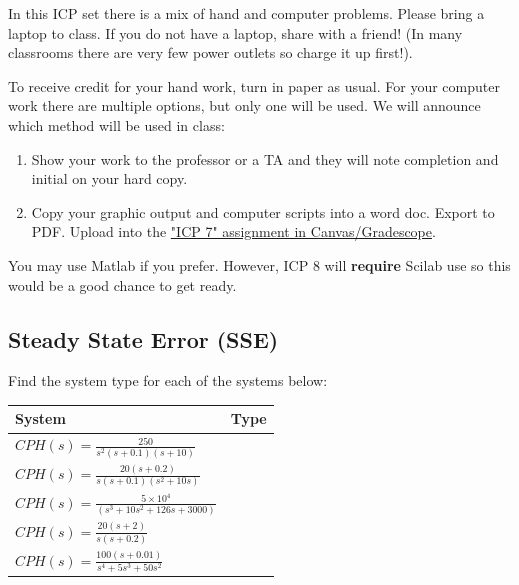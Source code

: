 \documentclass{article}	%
\begin{document}
In this ICP set there is a mix of hand and computer problems.  Please bring a laptop to class.  If you do not have a laptop, share with a friend!   (In many classrooms there are very few power outlets so charge it up first!).

To receive credit for your hand work, turn in paper as usual.  For your computer work there are multiple options, but only one will be used.   We will announce which method will be used in class:

\begin{enumerate}
  \item Show your work to the professor or a TA and they will note completion and initial on your hard copy.
  \item Copy your graphic output and computer scripts into a word doc.  Export to PDF.  Upload into the \href{https://canvas.uw.edu/courses/1116153/assignments/3823644}{"ICP 7" assignment in Canvas/Gradescope}.
\end{enumerate}

You may use Matlab if you prefer.   However, ICP 8 will {\bf require} Scilab use so this would be a good chance to get ready.


\subsection{Steady State Error (SSE)}
Find the system type for each of the systems below:

\renewcommand\arraystretch{2.0}%
\begin{tabular}{|l|c|}  \hline
System							& Type \\ \hline
$CPH(s) = \frac{250}        {s^2(s+0.1)(s+10)}$		&      \\ \hline
$CPH(s) = \frac{20(s+0.2)}  {s(s+0.1)(s^2+10s)}$	&      \\ \hline
$CPH(s) = \frac{5\times10^4}{(s^3+10s^2+126s+3000)}$	&      \\ \hline
$CPH(s) = \frac{20(s+2)}    {s(s+0.2)}$			&      \\ \hline
$CPH(s) = \frac{100(s+0.01)}{s^4+5s^3+50s^2}$		&      \\ \hline
\end{tabular}
%
%
\end{document}
